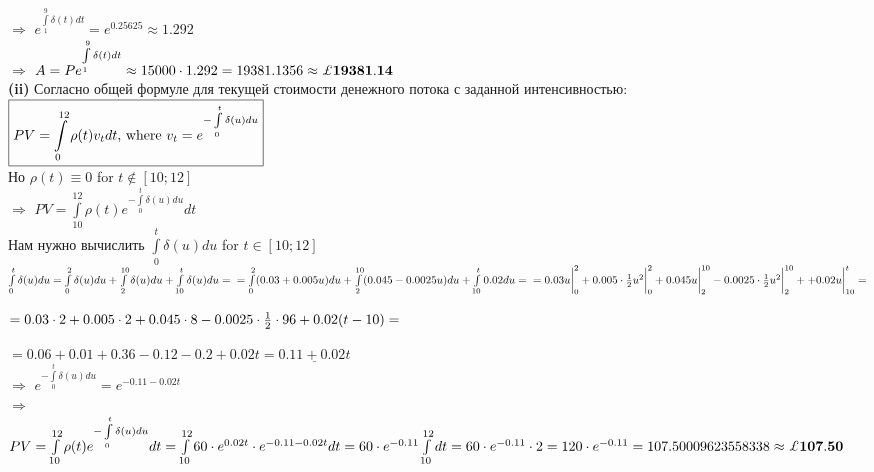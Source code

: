 \documentclass{article}
\begin{document}
$\Longrightarrow$ $ e^ { \int\limits_{1}^{9} \delta(t)dt } = e^{0.25625} \approx 1.292$\\

$\Longrightarrow$ $ A=Pe^ { \int\limits_{1}^{9} \delta(t)dt } \approx 15000 \cdot 1.292  = 19381.1356 \approx\bf \pounds19381.14$\\


{\bf \large  (ii)}  Согласно общей формуле для текущей стоимости денежного потока с заданной интенсивностью:\\
$ \boxed {PV = \int\limits_{0}^{12} \rho(t)  v_t dt $, where $v_t =  e^ { -\int\limits_{0}^{t} \delta(u)du } }$\\
Но  $\rho(t) \equiv 0$ for $t \notin [10;12]$\\
$\Longrightarrow$ $ PV = \int\limits_{10}^{12} \rho(t)  e^ { -\int\limits_{0}^{t} \delta(u)du }dt  $\\
Нам нужно вычислить $  \int\limits_{0}^{t} \delta(u)du$ for $ t \in [10;12] $\\

$\int\limits_{0}^{t} \delta(u)du  
= \int\limits_{0}^{2} \delta(u)du  + \int\limits_{2}^{10} \delta(u)du + \int\limits_{10}^{t} \delta(u)du=\\
= \int\limits_{0}^{2}   (0.03 +0.005u) du +  \int\limits_{2}^{10}   (0.045 -0.0025u) du + \int\limits_{10}^{t}  0.02 du=\\
= 0.03u \bigg |_0^2 +0.005 \cdot \frac{1}{2} u^2 \bigg |_0^2 
 + 0.045u \bigg |_2^{10} -0.0025 \cdot \frac{1}{2} u^2 \bigg |_2^{10}+
 +0.02u \bigg |_{10}^t =$
 
 $=0.03 \cdot 2  +0.005 \cdot 2 + 0.045 \cdot 8 - 0.0025 \cdot \frac{1}{2} \cdot 96 +0.02(t-10)=\\$
 
 $=0.06 + 0.01 +0.36 - 0.12 -0.2 +0.02t = \underline {0.11 +0.02t} $\\
 
 
 $\Longrightarrow$ $ e^ { -\int\limits_{0}^{t} \delta(u)du}  = e^{-0.11 -0.02t}$\\
 
$\Longrightarrow$ $PV=  \int\limits_{10}^{12} \rho(t)  e^ { -\int\limits_{0}^{t} \delta(u)du }dt  =
\int\limits_{10}^{12} 60 \cdot e^{0.02t } \cdot   e^ { -0.11 -0.02t }dt  = 
60 \cdot e^{-0.11}  \int\limits_{10}^{12} dt =
 60 \cdot e^{-0.11} \cdot 2 = 120 \cdot e^{-0.11}  = 107.50009623558338 \approx \bf \pounds107.50$\\
 

 
\end{document}
